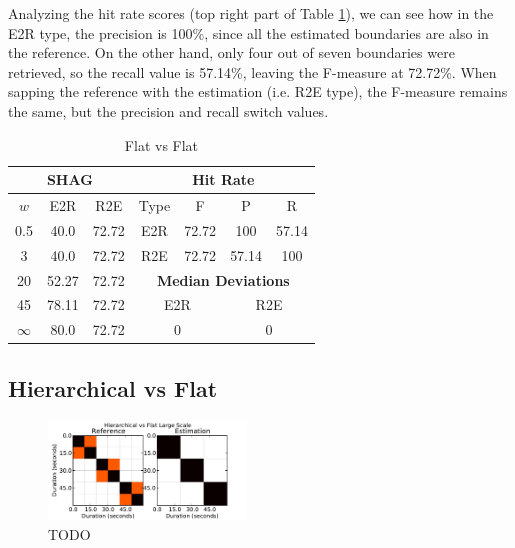 \documentclass{article}
\begin{document}
Analyzing the hit rate scores (top right part of Table \ref{tab:flat-flat}), we can see how in the E2R type, the precision is 100\%, since all the estimated boundaries are also in the reference.
On the other hand, only four out of seven boundaries were retrieved, so the recall value is 57.14\%, leaving the F-measure at 72.72\%.
When sapping the reference with the estimation (i.e. R2E type), the F-measure remains the same, but the precision and recall switch values.

\begin{table}
 \begin{center}
   \begin{tabular}{|c|c|c||c|c|c|c|}
  \hline
  \multicolumn{3}{|c||}{\textbf{SHAG}} & \multicolumn{4}{c|}{\textbf{Hit Rate}} \\
  \hline
  $w$ & E2R    & R2E & Type & F     & P     & R \\
  \hline
  0.5       & 40.0   & 72.72   & E2R & 72.72  & 100 & 57.14 \\
  3         & 40.0   & 72.72   & R2E & 72.72  & 57.14 & 100  \\
  \cline{4-7}
  20        & 52.27  & 72.72 & \multicolumn{4}{c|}{\textbf{Median Deviations}}   \\
  \cline{4-7}
  45        & 78.11  & 72.72 & \multicolumn{2}{c|}{E2R} & \multicolumn{2}{c|}{R2E} \\
  \cline{4-7}
  $\infty$  & 80.0   & 72.72 & \multicolumn{2}{c|}{0} & \multicolumn{2}{c|}{0}  \\
  \hline
 \end{tabular}
\end{center}
  \caption{Flat vs Flat}
  \label{tab:flat-flat}
\end{table}

\subsection{Hierarchical vs Flat}

\begin{figure}
  \centering
  \includegraphics[width=0.47\textwidth]{plots/hier-flatlarge.pdf}
  \caption{TODO}
  \label{fig:hier-flatlarge}
\end{figure}%
\end{document}
